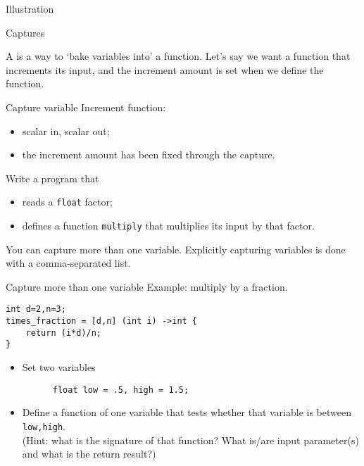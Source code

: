 \begin{block}{Illustration}
  \label{sl:lambda-classed}
\end{block}

 {Captures}

A  is a way to `bake variables into' a function.
Let's say we want a function that increments its input,
and the increment amount is set when we define the function.

\begin{block}{Capture variable}
  \label{sl:capture-increment}
  Increment function:
  \begin{itemize}
  \item scalar in, scalar out;
  \item the increment amount has been fixed through the capture.
  \end{itemize}
  \def\snippetcodefraction{.67}
  \def\snippetanswfraction{.3}  
\end{block}

\begin{exercise}
  \label{ex:capture-factor}
  Write a program that 
  \begin{itemize}
  \item reads a \lstinline{float} factor;
  \item defines a function \lstinline{multiply} that
    multiplies its input by that factor.
  \end{itemize}
\end{exercise}

You can capture more than one variable.
Explicitly capturing variables is done with a comma-separated list.

\begin{block}{Capture more than one variable}
  \label{sl:capture-fraction}
  Example: multiply by a fraction.
\begin{lstlisting}
int d=2,n=3;
times_fraction = [d,n] (int i) ->int {
    return (i*d)/n;
}
\end{lstlisting}
\end{block}

\begin{exercise}
  \label{ex:capture-between}
  \begin{itemize}
  \item Set two variables 
    \begin{lstlisting}
      float low = .5, high = 1.5;
    \end{lstlisting}
  \item Define a function of one variable that tests
    whether that variable is between \lstinline{low,high}.\\
    (Hint: what is the signature of that function?
    What is/are input parameter(s) and what is the return result?)
  \end{itemize}
\end{exercise}

